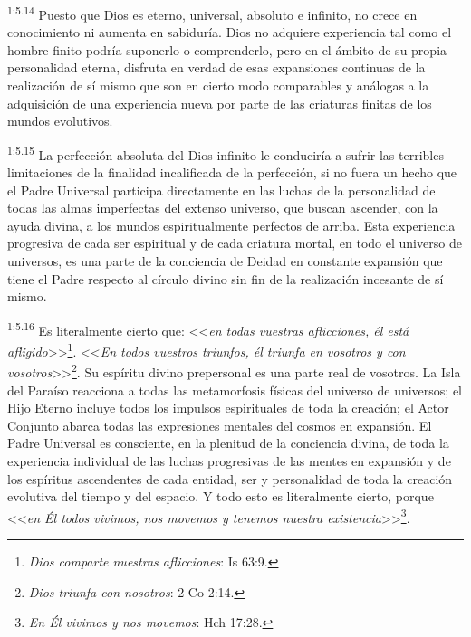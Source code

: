 \par
\textsuperscript{1:5.14} Puesto que Dios es eterno, universal, absoluto e infinito, no crece en conocimiento ni aumenta en sabiduría. Dios no adquiere experiencia tal como el hombre finito podría suponerlo o comprenderlo, pero en el ámbito de su propia personalidad eterna, disfruta en verdad de esas expansiones continuas de la realización de sí mismo que son en cierto modo comparables y análogas a la adquisición de una experiencia nueva por parte de las criaturas finitas de los mundos evolutivos.

\par
\textsuperscript{1:5.15} La perfección absoluta del Dios infinito le conduciría a sufrir las terribles limitaciones de la finalidad incalificada de la perfección, si no fuera un hecho que el Padre Universal participa directamente en las luchas de la personalidad de todas las almas imperfectas del extenso universo, que buscan ascender, con la ayuda divina, a los mundos espiritualmente perfectos de arriba. Esta experiencia progresiva de cada ser espiritual y de cada criatura mortal, en todo el universo de universos, es una parte de la conciencia de Deidad en constante expansión que tiene el Padre respecto al círculo divino sin fin de la realización incesante de sí mismo.

\par
\textsuperscript{1:5.16} Es literalmente cierto que: <<\textit{en todas vuestras aflicciones, él está afligido}>>\footnote{\textit{Dios comparte nuestras aflicciones}: Is 63:9.}. <<\textit{En todos vuestros triunfos, él triunfa en vosotros y con vosotros}>>\footnote{\textit{Dios triunfa con nosotros}: 2 Co 2:14.}. Su espíritu divino prepersonal es una parte real de vosotros. La Isla del Paraíso reacciona a todas las metamorfosis físicas del universo de universos; el Hijo Eterno incluye todos los impulsos espirituales de toda la creación; el Actor Conjunto abarca todas las expresiones mentales del cosmos en expansión. El Padre Universal es consciente, en la plenitud de la conciencia divina, de toda la experiencia individual de las luchas progresivas de las mentes en expansión y de los espíritus ascendentes de cada entidad, ser y personalidad de toda la creación evolutiva del tiempo y del espacio. Y todo esto es literalmente cierto, porque <<\textit{en Él todos vivimos, nos movemos y tenemos nuestra existencia}>>\footnote{\textit{En Él vivimos y nos movemos}: Hch 17:28.}.

